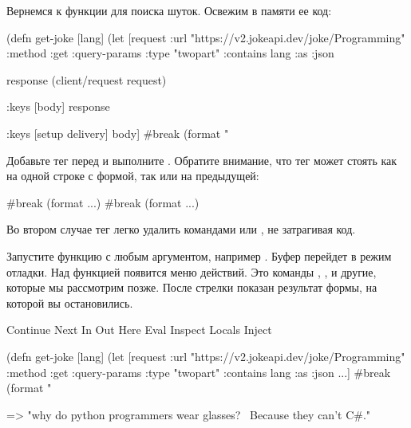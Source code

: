 Вернемся к функции  для поиска шуток. Освежим в памяти ее код:

\begin{english}
  \begin{clojure}
(defn get-joke [lang]
  (let [request
        {:url "https://v2.jokeapi.dev/joke/Programming"
         :method :get
         :query-params {:type "twopart" :contains lang}
         :as :json}

        response
        (client/request request)

        {:keys [body]}
        response

        {:keys [setup delivery]}
        body]
    #break
    (format "%
  \end{clojure}
\end{english}

Добавьте тег  перед  и выполните . Обратите внимание, что тег может стоять как на одной строке с формой, так или на предыдущей:

\begin{english}
\begin{clojure}
#break (format ...)     #break
                        (format ...)
  \end{clojure}
\end{english}

Во втором случае тег легко удалить командами  или , не затрагивая код.

Запустите функцию с любым аргументом, например . Буфер перейдет в режим отладки. Над функцией появится меню действий. Это команды , ,  и другие, которые мы рассмотрим позже. После стрелки \code{=>} показан результат формы, на которой вы остановились.

\begin{english}
  \begin{clojure}
Continue Next In Out Here Eval Inspect Locals Inject

(defn get-joke [lang]
  (let [request
        {:url "https://v2.jokeapi.dev/joke/Programming"
         :method :get
         :query-params {:type "twopart" :contains lang}
         :as :json}
        ...]
    #break
    (format "%

 => "why do python programmers wear glasses? \
     Because they can't C#."
  \end{clojure}
\end{english}

